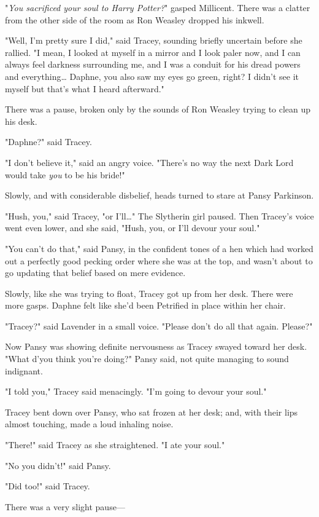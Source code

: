 "\emph{You sacrificed your soul to Harry Potter?}" gasped Millicent. There was 
a clatter from the other side of the room as Ron Weasley dropped his inkwell.

"Well, I'm pretty sure I did," said Tracey, sounding briefly uncertain before 
she rallied. "I mean, I looked at myself in a mirror and I look paler now, and 
I can always feel darkness surrounding me, and I was a conduit for his dread 
powers and everything{\ldots} Daphne, you also saw my eyes go green, right? I 
didn't see it myself but that's what I heard afterward."

There was a pause, broken only by the sounds of Ron Weasley trying to clean up 
his desk.

"Daphne?" said Tracey.

"I don't believe it," said an angry voice. "There's no way the next Dark Lord 
would take \emph{you} to be his bride!"

Slowly, and with considerable disbelief, heads turned to stare at Pansy 
Parkinson.

"Hush, you," said Tracey, "or I'll{\ldots}" The Slytherin girl paused. Then 
Tracey's voice went even lower, and she said, "Hush, you, or I'll devour your 
soul."

"You can't do that," said Pansy, in the confident tones of a hen which had 
worked out a perfectly good pecking order where she was at the top, and wasn't 
about to go updating that belief based on mere evidence.

Slowly, like she was trying to float, Tracey got up from her desk. There were 
more gasps. Daphne felt like she'd been Petrified in place within her chair.

"Tracey?" said Lavender in a small voice. "Please don't do all that again. 
Please?"

Now Pansy was showing definite nervousness as Tracey swayed toward her desk. 
"What d'you think you're doing?" Pansy said, not quite managing to sound 
indignant.

"I told you," Tracey said menacingly. "I'm going to devour your soul."

Tracey bent down over Pansy, who sat frozen at her desk; and, with their lips 
almost touching, made a loud inhaling noise.

"There!" said Tracey as she straightened. "I ate your soul."

"No you didn't!" said Pansy.

"Did too!" said Tracey.

There was a very slight pause---

